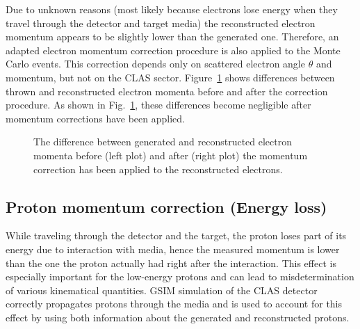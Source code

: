 Due to unknown reasons (most likely because electrons lose energy when they travel through the detector and target media) the reconstructed electron momentum appears to be slightly lower than the generated one. Therefore, an adapted electron momentum correction procedure is also applied to the Monte Carlo events. This correction depends only on scattered electron angle $\theta$ and momentum, but not on the CLAS sector.   
Figure~\ref{fig:el_mom_corr_sim} shows differences between thrown and reconstructed electron momenta before and after the correction procedure. As shown in Fig.~\ref{fig:el_mom_corr_sim}, these differences become negligible after momentum corrections have been applied.

\begin{figure}[htp]
\begin{center}
\caption{\small The difference between generated and reconstructed electron momenta before (left plot) and after (right plot) the momentum correction has been applied to the reconstructed electrons. \label{fig:el_mom_corr_sim}} 
\end{center}
\end{figure}

\subsection{Proton momentum correction (Energy loss)}
\label{protonmomcor}

While traveling through the detector and the target, the proton loses part of its energy due to interaction with media, hence the measured momentum is lower than the one the proton actually had right after the interaction. This effect is especially important for the low-energy protons and can lead to misdetermination of various kinematical quantities. GSIM simulation of the CLAS detector  correctly propagates protons through the media and is used to account for this effect by using both information about the generated and reconstructed protons. 

